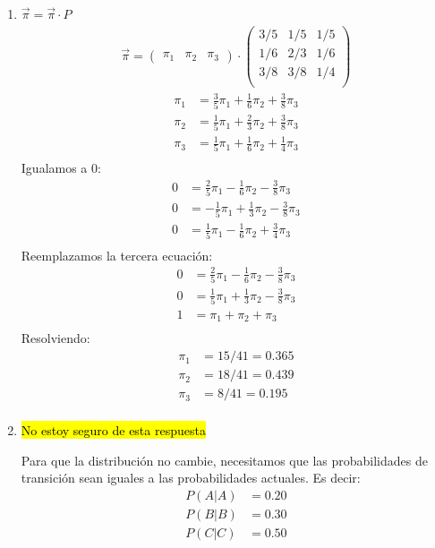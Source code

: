 \documentclass{templateNote}
\begin{document}
\begin{enumerate}[label=\alph*)]
    \item $\vec{\pi} = \vec{\pi} \cdot P$
    \begin{align*}
        \vec{\pi} = 
        \begin{pmatrix}
            \pi_1 & \pi_2 & \pi_3
        \end{pmatrix} 
        \cdot
        \begin{pmatrix}
            3/5 & 1/5 & 1/5 \\
            1/6 & 2/3 & 1/6 \\
            3/8 & 3/8 & 1/4 \\
        \end{pmatrix}
    \end{align*}
    \begin{align*}
        \pi_1 &= \frac{3}{5}\pi_1 + \frac{1}{6}\pi_2 + \frac{3}{8}\pi_3 \\
        \pi_2 &= \frac{1}{5}\pi_1 + \frac{2}{3}\pi_2 + \frac{3}{8}\pi_3 \\
        \pi_3 &= \frac{1}{5}\pi_1 + \frac{1}{6}\pi_2 + \frac{1}{4}\pi_3 \\
    \end{align*}
    Igualamos a 0:
    \begin{align*}
        0 &= \frac{2}{5}\pi_1 - \frac{1}{6}\pi_2 - \frac{3}{8}\pi_3 \\
        0 &= -\frac{1}{5}\pi_1 + \frac{1}{3}\pi_2 - \frac{3}{8}\pi_3 \\
        0 &= \frac{1}{5}\pi_1 - \frac{1}{6}\pi_2 + \frac{3}{4}\pi_3 \\
    \end{align*}
    Reemplazamos la tercera ecuación:
    \begin{align*}
        0 &= \frac{2}{5}\pi_1 - \frac{1}{6}\pi_2 - \frac{3}{8}\pi_3 \\
        0 &= \frac{1}{5}\pi_1 + \frac{1}{3}\pi_2 - \frac{3}{8}\pi_3 \\
        1 &= \pi_1 + \pi_2 + \pi_3 \\
    \end{align*}
    Resolviendo:
    \begin{align*}
        \pi_1 &= 15/41 = 0.365 \\
        \pi_2 &= 18/41 = 0.439\\
        \pi_3 &= 8/41 = 0.195\\  
    \end{align*}

    \item \hl{No estoy seguro de esta respuesta}
        \begin{tcolorbox}[colback=yellow!20, colframe=yellow, boxrule=1pt, rounded corners]
            Para que la distribución no cambie, necesitamos que las probabilidades de transición sean iguales a las probabilidades actuales. Es decir:
            \begin{align*}
                P(A|A) &= 0.20 \\
                P(B|B) &= 0.30 \\
                P(C|C) &= 0.50
            \end{align*}
        \end{tcolorbox}
\end{enumerate}
\end{document}
